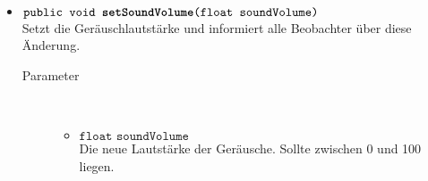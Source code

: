 \begin{description}
\begin{itemize}
		\item $\texttt{public void \textbf{setSoundVolume}(float soundVolume)}$ \\ Setzt die Geräuschlautstärke und informiert alle Beobachter über diese Änderung.
		\begin{description}
			\item[Parameter] \hfill \\
			\vspace{-.8cm}
			\begin{itemize}
				\item $\texttt{float soundVolume}$ \\ Die neue Lautstärke der Geräusche. Sollte zwischen 0 und 100 liegen.
			\end{itemize}
		\end{description}
	\end{itemize}
\end{description}